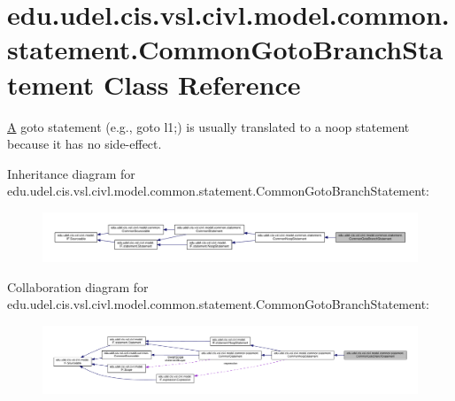\hypertarget{classedu_1_1udel_1_1cis_1_1vsl_1_1civl_1_1model_1_1common_1_1statement_1_1CommonGotoBranchStatement}{}\section{edu.\+udel.\+cis.\+vsl.\+civl.\+model.\+common.\+statement.\+Common\+Goto\+Branch\+Statement Class Reference}
\label{classedu_1_1udel_1_1cis_1_1vsl_1_1civl_1_1model_1_1common_1_1statement_1_1CommonGotoBranchStatement}


\hyperlink{structA}{A} goto statement (e.\+g., {\ttfamily goto l1;}) is usually translated to a noop statement because it has no side-\/effect.  




Inheritance diagram for edu.\+udel.\+cis.\+vsl.\+civl.\+model.\+common.\+statement.\+Common\+Goto\+Branch\+Statement\+:
\nopagebreak
\begin{figure}[H]
\begin{center}
\leavevmode
\includegraphics[width=350pt]{classedu_1_1udel_1_1cis_1_1vsl_1_1civl_1_1model_1_1common_1_1statement_1_1CommonGotoBranchStatement__inherit__graph}
\end{center}
\end{figure}


Collaboration diagram for edu.\+udel.\+cis.\+vsl.\+civl.\+model.\+common.\+statement.\+Common\+Goto\+Branch\+Statement\+:
\nopagebreak
\begin{figure}[H]
\begin{center}
\leavevmode
\includegraphics[width=350pt]{classedu_1_1udel_1_1cis_1_1vsl_1_1civl_1_1model_1_1common_1_1statement_1_1CommonGotoBranchStatement__coll__graph}
\end{center}
\end{figure}
